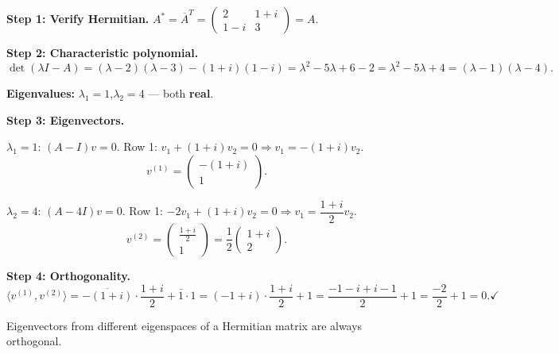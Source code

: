 \documentclass[12pt,a3paper]{article}
\begin{document}
\begin{tcolorbox}[enhanced,breakable,
  colback=cG!4,colframe=cG,boxrule=0.8pt,arc=5pt,
  title={\textbf{Answer --- Hermitian $A=\begin{pmatrix}2&1+i\\1-i&3\end{pmatrix}$: Real Eigenvalues \& Orthogonality}},
  fonttitle=\bfseries\color{white},colbacktitle=cG]
 
\textbf{Step 1: Verify Hermitian.}
$A^* = \overline{A}^T = \begin{pmatrix}2&1+i\\1-i&3\end{pmatrix} = A$. \checkmark
 
\textbf{Step 2: Characteristic polynomial.}
\[
\det(\lambda I - A) = (\lambda-2)(\lambda-3) - (1+i)(1-i) = \lambda^2 - 5\lambda + 6 - 2 = \lambda^2 - 5\lambda + 4 = (\lambda-1)(\lambda-4).
\]
 
\textbf{Eigenvalues:} $\lambda_1 = 1$,\quad $\lambda_2 = 4$ --- both \textbf{real}. \checkmark
 
\textbf{Step 3: Eigenvectors.}
 
$\lambda_1 = 1$: $(A-I)v=0$. Row 1: $v_1 + (1+i)v_2 = 0 \Rightarrow v_1 = -(1+i)v_2$.
\[
v^{(1)} = \begin{pmatrix}-(1+i)\\1\end{pmatrix}.
\]
 
$\lambda_2 = 4$: $(A-4I)v=0$. Row 1: $-2v_1+(1+i)v_2=0 \Rightarrow v_1 = \dfrac{1+i}{2}v_2$.
\[
v^{(2)} = \begin{pmatrix}\frac{1+i}{2}\\1\end{pmatrix} = \frac{1}{2}\begin{pmatrix}1+i\\2\end{pmatrix}.
\]
 
\textbf{Step 4: Orthogonality.}
\[
\langle v^{(1)},v^{(2)}\rangle = \overline{-(1+i)}\cdot\frac{1+i}{2} + \bar{1}\cdot 1
= (-1+i)\cdot\frac{1+i}{2} + 1
= \frac{-1-i+i-1}{2} + 1 = \frac{-2}{2}+1 = 0. \checkmark
\]
 
Eigenvectors from different eigenspaces of a Hermitian matrix are always orthogonal. \checkmark
 
\end{tcolorbox}
\end{document}
